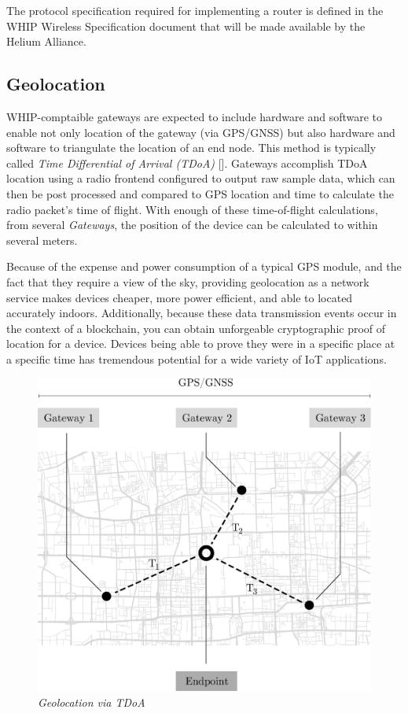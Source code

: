 \documentclass[letterpaper,11pt]{article}
\begin{document}
The protocol specification required for implementing a router is defined in the WHIP Wireless Specification document that will be made available by the Helium Alliance\cite{alliance}.

\subsection{Geolocation} \label{geolocation}

WHIP-comptaible gateways are expected to include hardware and software to enable not only location of the gateway (via GPS/GNSS) but also hardware and software to triangulate the location of an end node. This method is typically called \textit{Time Differential of Arrival (TDoA)} [\cite{tdoa}]. Gateways accomplish TDoA location using a radio frontend configured to output raw sample data, which can then be post processed and compared to GPS location and time to calculate the radio packet's time of flight. With enough of these time-of-flight calculations, from several \textit{Gateways}, the position of the device can be calculated to within several meters.\newline

Because of the expense and power consumption of a typical GPS module, and the fact that they require a view of the sky, providing geolocation as a network service makes devices cheaper, more power efficient, and able to located accurately indoors. Additionally, because these data transmission events occur in the context of a blockchain, you can obtain unforgeable cryptographic proof of location for a device. Devices being able to prove they were in a specific place at a specific time has tremendous potential for a wide variety of IoT applications.\newline

\begin{figure}[H]
	\begin{center}
  		\includegraphics[scale=0.3]{tdoa.eps}
  		\caption{\textit{Geolocation via TDoA}}
  		\label{fig:tdoa}
 	\end{center}
\end{figure}
\end{document}

